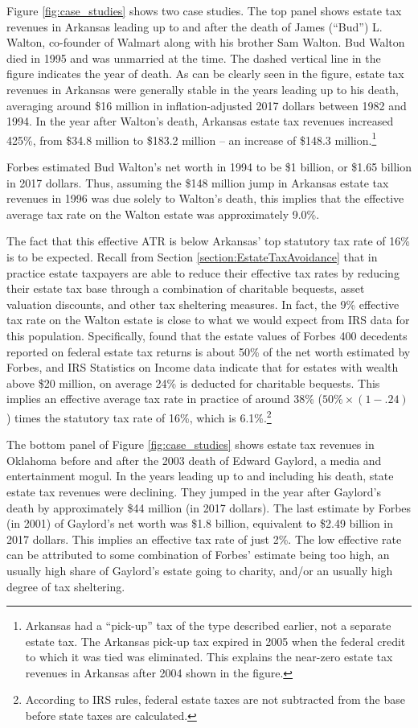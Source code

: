 \documentclass[12pt]{article}
\begin{document}
Figure \ref{fig:case_studies} shows two case studies. The top panel shows estate tax revenues in Arkansas leading up to and after the death of James (``Bud'') L. Walton, co-founder of Walmart along with his brother Sam Walton. Bud Walton died in 1995 and was unmarried at the time. The dashed vertical line in the figure indicates the year of death. As can be clearly seen in the figure, estate tax revenues in Arkansas were generally stable in the years leading up to his death, averaging around \$16 million in inflation-adjusted 2017 dollars between 1982 and 1994. In the year after Walton's death, Arkansas estate tax revenues increased 425\%, from \$34.8 million to \$183.2 million -- an increase of \$148.3 million.\footnote{Arkansas had a ``pick-up'' tax of the type described earlier, not a separate estate tax. The Arkansas pick-up tax expired in 2005 when the federal credit to which it was tied was eliminated. This explains the near-zero estate tax revenues in Arkansas after 2004 shown in the figure.}

Forbes estimated Bud Walton's net worth in 1994 to be \$1 billion, or \$1.65 billion in 2017 dollars. Thus, assuming the \$148 million jump in Arkansas estate tax revenues in 1996 was due solely to Walton's death, this implies that the effective average tax rate on the Walton estate was approximately 9.0\%. 

The fact that this effective ATR is below Arkansas' top statutory tax rate of 16\% is to be expected. Recall from Section \ref{section:EstateTaxAvoidance} that in practice estate taxpayers are able to reduce their effective tax rates by reducing their estate tax base through a combination of charitable bequests, asset valuation discounts, and other tax sheltering measures. In fact, the 9\% effective tax rate on the Walton estate is close to what we would expect from IRS data for this population. Specifically, \cite{raub2010comparison} found that the estate values of Forbes 400 decedents reported on federal estate tax returns is about 50\% of the net worth estimated by Forbes, and IRS Statistics on Income data indicate that for estates with wealth above \$20 million, on average 24\% is deducted for charitable bequests. This implies an effective average tax rate in practice of around 38\% ($50\% \times (1-.24)$) times the statutory tax rate of 16\%, which is 6.1\%.\footnote{According to IRS rules, federal estate taxes are not subtracted from the base before state taxes are calculated.}


The bottom panel of Figure \ref{fig:case_studies} shows estate tax revenues in Oklahoma before and after the 2003 death of Edward Gaylord, a media and entertainment mogul. In the years leading up to and including his death, state estate tax revenues were declining. They jumped in the year after Gaylord's death by approximately \$44 million (in 2017 dollars). The last estimate by Forbes (in 2001) of Gaylord's net worth was \$1.8 billion, equivalent to \$2.49 billion in 2017 dollars. This implies an effective tax rate of just 2\%. The low effective rate can be attributed to some combination of Forbes' estimate being too high, an usually high share of Gaylord's estate going to charity, and/or an usually high degree of tax sheltering.   
\end{document}
